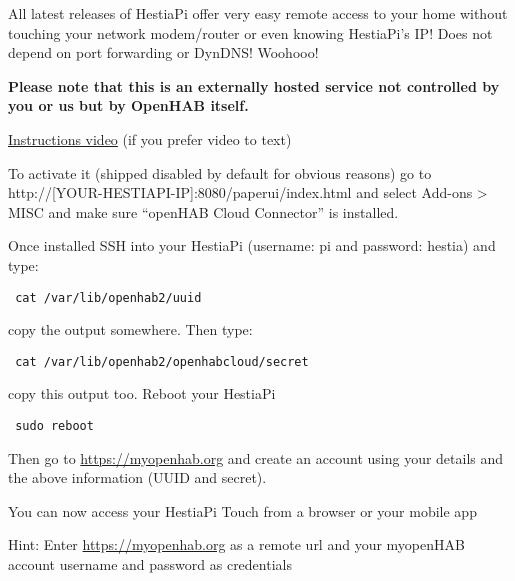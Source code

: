 All latest releases of HestiaPi offer very easy remote access to your home
without touching your network modem/router or even knowing HestiaPi's IP! Does
not depend on port forwarding or DynDNS! Woohooo!

\textbf{Please note that this is an externally hosted service not controlled by
you or us but by OpenHAB itself.}

\href{https://www.youtube.com/watch?v=joz5f4ejJVc}{Instructions video} (if you
prefer video to text)

To activate it (shipped disabled by default for obvious reasons) go to
http://[YOUR-HESTIAPI-IP]:8080/paperui/index.html and select Add-ons > MISC and make
sure ``openHAB Cloud Connector'' is installed.

Once installed SSH into your HestiaPi (username: pi and password: hestia) and
type:

\texttt{    cat /var/lib/openhab2/uuid}

 copy the output somewhere. Then type:

\texttt{        cat /var/lib/openhab2/openhabcloud/secret}

copy this output too. Reboot your HestiaPi

\texttt{        sudo reboot}

    
Then go to \url{https://myopenhab.org} and create an account using your details
and the above information (UUID and secret).

You can now access your HestiaPi Touch from a browser or your mobile app

Hint: Enter \url{https://myopenhab.org} as a remote url and your myopenHAB
account username and password as credentials
